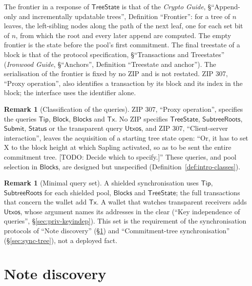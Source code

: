 \documentclass[11pt,a4paper]{article}
\theoremstyle{definition}
\newtheorem{remark}[theorem]{Remark}
\begin{document}
The frontier in a response of $\mathsf{TreeState}$ is that of the
\emph{Crypto Guide}, \S``Append-only and incrementally updatable trees'',
Definition ``Frontier'': for a tree of $n$ leaves, the left-sibling nodes
along the path of the next leaf, one for each set bit of $n$, from which the
root and every later append are computed. The empty frontier is the state
before the pool's first commitment. The final treestate of a block is that
of the protocol specification, \S``Transactions and Treestates''
(\emph{Ironwood Guide}, \S``Anchors'', Definition ``Treestate and anchor''). The
serialisation of the frontier is fixed by no ZIP and is not restated. ZIP
307, ``Proxy operation'', also identifies a transaction by its block and its
index in the block; the interface uses the identifier alone.

\begin{remark}[Classification of the queries]
ZIP 307, ``Proxy operation'', specifies the queries $\mathsf{Tip}$,
$\mathsf{Block}$, $\mathsf{Blocks}$ and $\mathsf{Tx}$. No ZIP specifies
$\mathsf{TreeState}$, $\mathsf{SubtreeRoots}$, $\mathsf{Submit}$,
$\mathsf{Status}$ or the transparent query $\mathsf{Utxos}$, and ZIP 307,
``Client-server interaction'', leaves the acquisition of a starting tree
state open: ``Or, it has to set X to the block height at which Sapling
activated, so as to be sent the entire commitment tree. [TODO: Decide which
to specify.]'' These queries, and pool selection in $\mathsf{Blocks}$, are
designed but unspecified (Definition~\ref{def:intro-classes}).
\end{remark}

\begin{remark}[Minimal query set]
A shielded synchronisation uses $\mathsf{Tip}$, $\mathsf{SubtreeRoots}$ for
each shielded pool, $\mathsf{Blocks}$ and $\mathsf{TreeState}$; the full
transactions that concern the wallet add $\mathsf{Tx}$. A wallet that
watches transparent receivers adds $\mathsf{Utxos}$, whose argument names
its addresses in the clear (``Key independence of queries'',
\S\ref{sec:priv-keyindep}). This set is the requirement of the
synchronisation protocols of ``Note discovery''
(\S\ref{sec:sync-scanning}) and ``Commitment-tree synchronisation''
(\S\ref{sec:sync-tree}), not a deployed fact.
\end{remark}

\section{Note discovery}\label{sec:sync-scanning}
\end{document}
